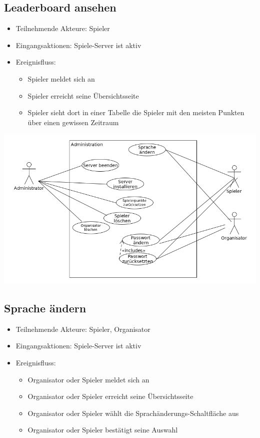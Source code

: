 \documentclass[a4paper]{scrreprt}
\begin{document}
    \subsection{Leaderboard ansehen}
    \begin{itemize}
        \item Teilnehmende Akteure: \Gls{Spieler}
        \item Eingangsaktionen: Spiele-Server ist aktiv
        \item Ereignisfluss:
        \begin{itemize}
            \item Spieler meldet sich an
            \item Spieler erreicht seine Übersichtsseite
            \item Spieler sieht dort in einer Tabelle die Spieler mit den meisten Punkten über einen gewissen Zeitraum
        \end{itemize}
    \end{itemize}
    \newpage
    \includegraphics[width=\textwidth]{uml/export/Administration.png}
     \subsection{Sprache ändern}
    \begin{itemize}
    \item Teilnehmende Akteure: \Gls{Spieler}, \Gls{Organisator}
    \item Eingangsaktionen: Spiele-Server ist aktiv
    \item Ereignisfluss:
        \begin{itemize}
            \item Organisator oder Spieler meldet sich an
            \item Organisator oder Spieler erreicht seine Übersichtsseite
            \item Organisator oder Spieler wählt die Sprachänderungs-Schaltfläche aus
            \item Organisator oder Spieler bestätigt seine Auswahl
        \end{itemize}
    \end{itemize}
\end{document}
